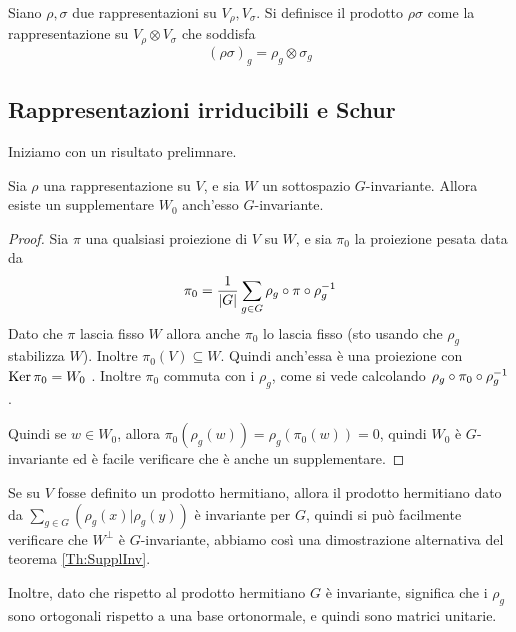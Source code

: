 \documentclass[a4paper,10pt,oneside]{math_article}
\newcommand{\herm}[2]{\left(#1 | #2\right)}
\begin{document}
    \begin{mydef}
      Siano $\rho,\sigma$ due rappresentazioni su $V_\rho,V_\sigma$. Si definisce il prodotto $\rho\sigma$ come la rappresentazione su $V_\rho \otimes V_\sigma$ che soddisfa
      \[
       (\rho\sigma)_g = \rho_g \otimes \sigma_g
      \]
    \end{mydef}


  
  \subsection{Rappresentazioni irriducibili e Schur}
  
  Iniziamo con un risultato prelimnare.
  
    \begin{mytheorem}\label{Th:SupplInv}
     Sia $\rho$ una rappresentazione su $V$, e sia $W$ un sottospazio $G$-invariante. Allora esiste un supplementare $W_0$ anch'esso $G$-invariante.
    \end{mytheorem}
    
    \begin{proof}
     Sia $\pi$ una qualsiasi proiezione di $V$ su $W$, e sia $\pi_0$ la proiezione pesata data da
     \[
      \pi_0=\frac1{\left|G\right|} \sum_{g\in G} \rho_g \circ \pi \circ \rho_g^{-1}
     \]
     Dato che $\pi$ lascia fisso $W$ allora anche $\pi_0$ lo lascia fisso (sto usando che $\rho_g$ stabilizza $W$). Inoltre $\pi_0(V) \subseteq W$. Quindi anch'essa è una proiezione con $\operatorname{Ker} \pi_0=W_0$ . Inoltre $\pi_0$ commuta con i $\rho_g$, come si vede calcolando $\rho_g \circ \pi_0 \circ \rho_g^{-1}$.
     
     Quindi se $w\in W_0$, allora $\pi_0 (\rho_g(w))=\rho_g(\pi_0(w))=0$, quindi $W_0$ è $G$-invariante ed è facile verificare che è anche un supplementare.
    \end{proof}
    \begin{myobs}
     Se su $V$ fosse definito un prodotto hermitiano, allora il prodotto hermitiano dato da $\sum_{g\in G}\herm {\rho_g(x)}{\rho_g(y)}$ è invariante per $G$, quindi si può facilmente verificare che $W^\perp$ è $G$-invariante, abbiamo così una dimostrazione alternativa del teorema \ref{Th:SupplInv}.
     
     Inoltre, dato che rispetto al prodotto hermitiano $G$ è invariante, significa che i $\rho_g$ sono ortogonali rispetto a una base ortonormale, e quindi sono matrici unitarie.
    \end{myobs}
\end{document}
